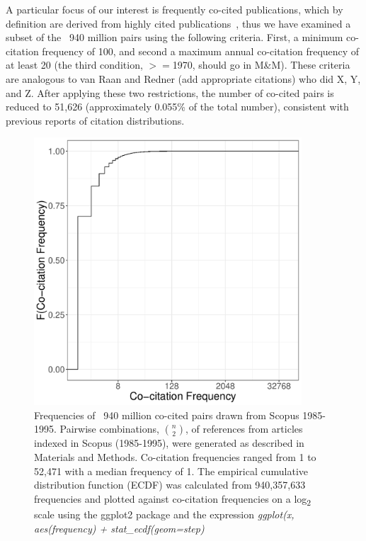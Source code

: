 \documentclass[utf8]{frontiersSCNS}
\begin{document}
A particular focus of our interest is frequently co-cited publications, which by definition are derived from highly cited publications~\cite{Small1973}, thus we have examined a subset of the ~940 million pairs using the following criteria. First, a minimum co-citation frequency of 100, and second a maximum annual co-citation frequency of at least 20 (the third condition, $>=$1970, should go in M\&M). These criteria are analogous to van Raan and Redner (add appropriate citations) who did X, Y, and Z. After applying these two restrictions, the number of co-cited pairs is reduced to 51,626 (approximately 0.055\% of the total number), consistent with previous reports of citation distributions. 

\begin{figure}[h!]
\begin{center}
\includegraphics[width=10cm]{fig1}%
\end{center}
\caption{ Frequencies of ~940 million co-cited pairs drawn from Scopus 1985-1995. Pairwise combinations, $n\choose 2$, of references from articles indexed in Scopus (1985-1995), were generated as described in Materials and Methods. Co-citation frequencies ranged from 1 to 52,471 with a median frequency of 1. The empirical cumulative distribution function (ECDF) was calculated from 940,357,633 frequencies and plotted against co-citation frequencies on a log\textsubscript{2} scale using the ggplot2 package and the expression \emph{ggplot(x, aes(frequency) + stat\_ecdf(geom=\textquotesingle step\textquotesingle)}}
\label{fig:fig1}
\end{figure}
\end{document}
